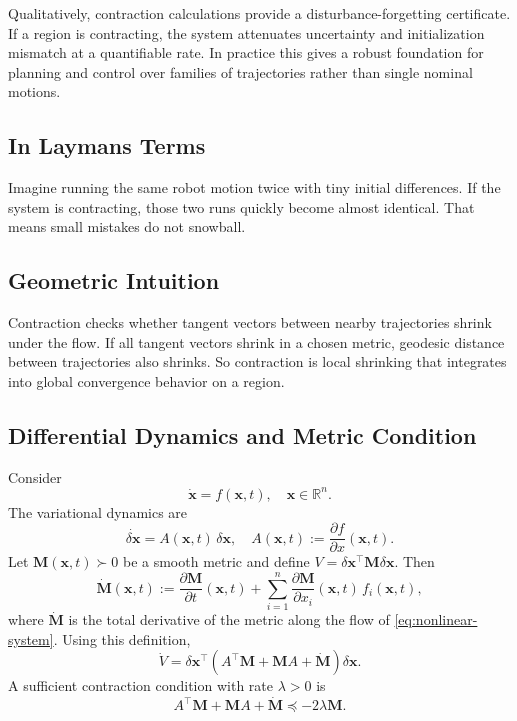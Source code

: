 \documentclass[11pt,letterpaper]{article}
\newcommand{\R}{\mathbb{R}}
\newcommand{\M}{\mathbf{M}}
\newcommand{\x}{\mathbf{x}}
\newcommand{\dx}{\delta\mathbf{x}}
\begin{document}
Qualitatively, contraction calculations provide a disturbance-forgetting certificate. If a region is contracting, the system attenuates uncertainty and initialization mismatch at a quantifiable rate. In practice this gives a robust foundation for planning and control over families of trajectories rather than single nominal motions.

\subsection{In Laymans Terms}
Imagine running the same robot motion twice with tiny initial differences. If the system is contracting, those two runs quickly become almost identical. That means small mistakes do not snowball.

\subsection{Geometric Intuition}
Contraction checks whether tangent vectors between nearby trajectories shrink under the flow. If all tangent vectors shrink in a chosen metric, geodesic distance between trajectories also shrinks. So contraction is local shrinking that integrates into global convergence behavior on a region.

\subsection{Differential Dynamics and Metric Condition}
Consider
\begin{equation}
\dot{\x} = f(\x,t), \quad \x \in \R^n.
\label{eq:nonlinear-system}
\end{equation}
The variational dynamics are
\begin{equation}
\dot{\dx} = A(\x,t)\,\dx, \quad A(\x,t) := \frac{\partial f}{\partial x}(\x,t).
\label{eq:variational-dynamics}
\end{equation}
Let $\M(\x,t) \succ 0$ be a smooth metric and define $V = \dx^\top \M\dx$. Then
\begin{equation}
\dot{\M}(\x,t)
:= \frac{\partial \M}{\partial t}(\x,t)
 + \sum_{i=1}^{n}\frac{\partial \M}{\partial x_i}(\x,t)\,f_i(\x,t),
\label{eq:metric-total-derivative}
\end{equation}
where $\dot{\M}$ is the total derivative of the metric along the flow of \eqref{eq:nonlinear-system}. Using this definition,
\begin{equation}
\dot V = \dx^\top\!\left(A^\top\M + \M A + \dot{\M}\right)\!\dx.
\label{eq:metric-derivative}
\end{equation}
A sufficient contraction condition with rate $\lambda>0$ is
\begin{equation}
A^\top\M + \M A + \dot{\M} \preceq -2\lambda\M.
\label{eq:contraction-lmi}
\end{equation}
\end{document}
